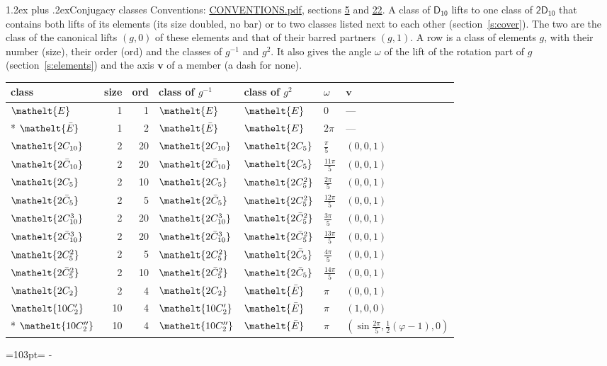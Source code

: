 \documentclass[10pt,a4paper]{article}
\makeatletter
\renewcommand\section{\@startsection{section}{1}{\z@}{-3ex plus -1ex minus -.2ex}%
  {1.2ex plus .2ex}{\normalfont\large\sffamily\bfseries\color{parttitle}}}
\newcommand{\needspace}[1]{\par\penalty-100\begingroup\dimen0=#1\relax\dimen2=\pagegoal
  \advance\dimen2-\pagetotal\ifdim\dimen0>\dimen2\relax\ifdim\dimen2>0pt\vfil\break\fi\fi
  \endgroup}
\numberwithin{equation}{section}
\newcommand{\eltfont}[1]{{\let\sigma\eltsigma\mathelt{#1}}}
\newcommand{\grp}[1]{\mathsf{#1}}
\newcommand{\cls}[1]{\eltfont{#1}}
\newcommand{\dirvec}[3]{(#1, #2, #3)}
\newcommand{\vv}{\mathbf{v}}
\newcommand{\goldenratio}{\varphi}
\newcommand{\barred}[1]{\bar{#1}}
\makeatother
\begin{document}
\section{Conjugacy classes}\label{s:classes}
Conventions: \href{../../CONVENTIONS.pdf}{CONVENTIONS.pdf}, sections \href{../../../rotation/CONVENTIONS.pdf\#conv.5}{5} and \href{../../CONVENTIONS.pdf\#conv.22}{22}.
A class of $\grp{D_{10}}$ lifts to one class of $\grp{2D_{10}}$ that contains both lifts of its elements (its size doubled, no bar) or to two classes listed next to each other (section~\ref{s:cover}). The two are the class of the canonical lifts $(g, 0)$ of these elements and that of their barred partners $(g, 1)$.
\leavevmode\label{n:head.size}\label{n:head.classof}A row is a class of elements $g$, with their number (size), their order (ord) and the classes of $g^{-1}$ and $g^{2}$. It also gives the angle $\omega$ of the lift of the rotation part of $g$ (section~\ref{s:elements}) and the axis $\vv$ of a member (a dash for none).
{\renewcommand{\arraystretch}{1.3}\begin{longtable}{@{}lrrllll@{}}\toprule
class & size & ord & class of $g^{-1}$ & class of $g^{2}$ & $\omega$ & $\vv$\\\midrule\endhead
\bottomrule\endfoot\endlastfoot
$\cls{E}$ & 1 & 1 & $\cls{E}$ & $\cls{E}$ & $0$ & ---\\*
$\cls{\barred{E}}$ & 1 & 2 & $\cls{\barred{E}}$ & $\cls{E}$ & $2\pi$ & ---\\
$\cls{2C_{10}}$ & 2 & 20 & $\cls{2C_{10}}$ & $\cls{2C_{5}}$ & $\tfrac{\pi}{5}$ & $\dirvec{0}{0}{1}$\\
$\cls{2\barred{C}_{10}}$ & 2 & 20 & $\cls{2\barred{C}_{10}}$ & $\cls{2C_{5}}$ & $\tfrac{11\pi}{5}$ & $\dirvec{0}{0}{1}$\\
$\cls{2C_{5}}$ & 2 & 10 & $\cls{2C_{5}}$ & $\cls{2C_{5}^{2}}$ & $\tfrac{2\pi}{5}$ & $\dirvec{0}{0}{1}$\\
$\cls{2\barred{C}_{5}}$ & 2 & 5 & $\cls{2\barred{C}_{5}}$ & $\cls{2C_{5}^{2}}$ & $\tfrac{12\pi}{5}$ & $\dirvec{0}{0}{1}$\\
$\cls{2C_{10}^{3}}$ & 2 & 20 & $\cls{2C_{10}^{3}}$ & $\cls{2\barred{C}_{5}^{2}}$ & $\tfrac{3\pi}{5}$ & $\dirvec{0}{0}{1}$\\
$\cls{2\barred{C}_{10}^{3}}$ & 2 & 20 & $\cls{2\barred{C}_{10}^{3}}$ & $\cls{2\barred{C}_{5}^{2}}$ & $\tfrac{13\pi}{5}$ & $\dirvec{0}{0}{1}$\\
$\cls{2C_{5}^{2}}$ & 2 & 5 & $\cls{2C_{5}^{2}}$ & $\cls{2\barred{C}_{5}}$ & $\tfrac{4\pi}{5}$ & $\dirvec{0}{0}{1}$\\
$\cls{2\barred{C}_{5}^{2}}$ & 2 & 10 & $\cls{2\barred{C}_{5}^{2}}$ & $\cls{2\barred{C}_{5}}$ & $\tfrac{14\pi}{5}$ & $\dirvec{0}{0}{1}$\\
$\cls{2C_{2}}$ & 2 & 4 & $\cls{2C_{2}}$ & $\cls{\barred{E}}$ & $\pi$ & $\dirvec{0}{0}{1}$\\
$\cls{10C_{2}'}$ & 10 & 4 & $\cls{10C_{2}'}$ & $\cls{\barred{E}}$ & $\pi$ & $\dirvec{1}{0}{0}$\\*
$\cls{10C_{2}''}$ & 10 & 4 & $\cls{10C_{2}''}$ & $\cls{\barred{E}}$ & $\pi$ & $\dirvec{\sin\tfrac{2\pi}{5}}{\tfrac{1}{2}(\goldenratio - 1)}{0}$\\
\bottomrule\end{longtable}}
\needspace{103pt}
\end{document}
